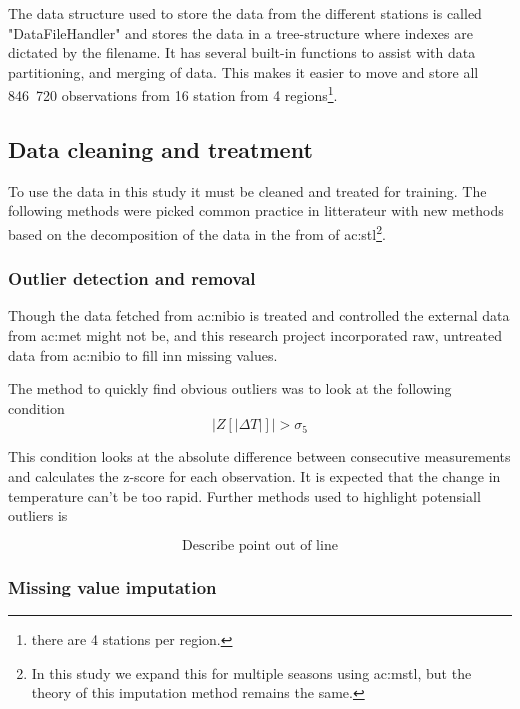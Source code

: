 The data structure used to store the data from the different stations is called "DataFileHandler" and stores the data in a tree-structure where indexes are dictated by the filename. It has several built-in functions to assist with data partitioning, and merging of data. This makes it easier to move and store all 846 720 observations from 16 station from 4 regions\footnote{there are 4 stations per region.}. 

\subsection{Data cleaning and treatment}

To use the data in this study it must be cleaned and treated for training. The following methods were picked common practice in litterateur with new methods based on the decomposition of the data in the from of \acrfull{ac:stl}\cite{cleveland_stl_1990}\footnote{In this study we expand this for multiple seasons using \acrfull{ac:mstl}\cite{bandara_mstl_2021}, but the theory of this imputation method remains the same.}.

\subsubsection{Outlier detection and removal}

Though the data fetched from \acrshort{ac:nibio} is treated and controlled the external data from \acrshort{ac:met} might not be, and this research project incorporated raw, untreated data from \acrshort{ac:nibio} to fill inn missing values.

The method to quickly find obvious outliers was to look at the following condition
$$
	|Z[|\Delta T|]|> \sigma_5
$$

This condition looks at the absolute difference between consecutive measurements and calculates the z-score for each observation. It is expected that the change in temperature can't be too rapid. Further methods used to highlight potensiall outliers is 

$$
	\text{Describe point out of line}
$$

\subsubsection{Missing value imputation}

